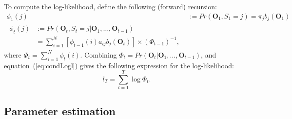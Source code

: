 \documentclass[article]{jss}
\newcommand{\vc}{\mathbf}
\begin{document}
To compute the log-likelihood, \cite{Lystig2002} define the following 
(forward) recursion:
\begin{align}
	\phi_{1}(j) &:= Pr(\vc{O}_{1}, S_{1}=j) = \pi_{j} b_{j}(\vc{O}_{1}) 
	\label{eq:fwd1} \\
\begin{split}
	\phi_{t}(j) &:= Pr(\vc{O}_{t}, S_{t}=j|\vc{O}_{1}, \ldots, 
\vc{O}_{t-1}) \\
	&= \sum_{i=1}^{N} [\phi_{t-1}(i)a_{ij}b_{j}(\vc{O}_{t})] \times 
(\Phi_{t-1})^{-1},
	\label{eq:fwdt} 
\end{split} 
\end{align}
where $\Phi_{t}=\sum_{i=1}^{N} \phi_{t}(i)$. Combining 
$\Phi_{t}=Pr(\vc{O}_{t}|\vc{O}_{1}, \ldots, \vc{O}_{t-1})$, and 
equation~(\ref{eq:condLogl}) gives the following expression for the 
log-likelihood:
\begin{equation}
	l_{T} = \sum_{t=1}^{T} \log \Phi_{t}.
	\label{eq:logl}
\end{equation}


\subsection{Parameter estimation}
\end{document}
